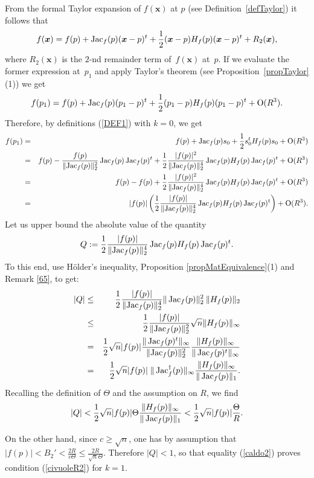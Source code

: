 \documentclass[10pt]{article}
\newcommand{\x}{{\bm x}}
\def\Jac{\mathop{\rm Jac}\nolimits}
\begin{document}
{From the formal Taylor expansion of $f(\x)$ at $p$ (see 
Definition~\ref{defTaylor}) it follows that
$$
f(\x) = f(p) + \Jac_f(p) (\x-p)^t + \frac{1}{2}(\x-p)H_f(p) (\x-p)^t + R_2(\x),
$$
where $R_2(\bm x)$ is the $2$-nd remainder term of~$f(\x)$ at~$p$.
If we evaluate the former expression at~$p_1$ and apply 
Taylor's theorem (see Proposition~\ref{propTaylor}(1)) we get
\begin{eqnarray*}
f(p_1) = f(p) + \Jac_f(p) (p_1-p)^t + 
\frac{1}{2}(p_1-p)H_f(p) (p_1-p)^t + {\rm O}(R^3).
\end{eqnarray*}
Therefore, by  definitions (\ref{DEF1}) with $k=0$,
we get
\begin{eqnarray}\label{caldo2} \nonumber
f(p_1)  &=&  f(p) + \Jac_f(p) s_0 +  \frac{1}{2} s_0^t H_f(p) s_0 + {\rm O}(R^3)\\ \nonumber
&=&  f(p) - \frac{f(p)}{\|{\rm Jac}_f(p)\|_2^2} \Jac_f(p)  \Jac_f(p)^t +  
\frac{1}{2} \frac{|f(p)|^2}{\|{\rm Jac}_f(p)\|_2^4} \Jac_f(p) H_f(p) \Jac_f(p)^t + {\rm O}(R^3)\\ \nonumber
&=& f(p) - f(p) +  
\frac{1}{2} \frac{|f(p)|^2}{\|{\rm Jac}_f(p)\|_2^4} \Jac_f(p) H_f(p) \Jac_f(p)^t + {\rm O}(R^3)\\ 
&=&  |f(p)| \left ( 
\frac{1}{2} \frac{|f(p)|}{\|{\rm Jac}_f(p)\|_2^4} \Jac_f(p) H_f(p) \Jac_f(p)^t \right ) + {\rm O}(R^3). 
\end{eqnarray}
Let us upper bound the absolute value of the quantity
$$
Q:= \frac{1}{2} \frac{|f(p)|}{\|{\rm Jac}_f(p)\|_2^4} \Jac_f(p) H_f(p) \Jac_f(p)^t.
$$
To this end, use  H\"older's inequality, 
 Proposition  \ref{propMatEquivalence}(1) and Remark \ref{65}, to get:
\begin{eqnarray*}
|Q| &\le & \frac{1}{2} \frac{|f(p)|}{\|{\rm Jac}_f(p)\|_2^4}  \| \Jac_f(p)\|_2^2 \: \|H_f(p)\|_2\\
&\le & \frac{1}{2} \frac{|f(p)|}{\|{\rm Jac}_f(p)\|_2^2}  \sqrt{n} \|H_f(p)\|_\infty \\
&=&  \frac{1}{2} \sqrt{n} |f(p)| \frac{\|\Jac_f(p)^t\|_\infty}{\|{\rm Jac}_f(p)\|_2^2}  
\frac{\|H_f(p)\|_\infty}{\|\Jac_f(p)^t\|_\infty}\\
&=& \frac{1}{2} \sqrt{n} |f(p)| \; \|\Jac_f^\dagger(p)\|_\infty  \frac{\| H_f(p)\|_\infty}{\|\Jac_f(p)\|_1}.   
\end{eqnarray*}
Recalling the definition of $\Theta$ and the assumption on $R$, we find
$$
|Q|< \frac{1}{2} \sqrt{n} |f(p)| \Theta  \frac{ \| H_f(p)\|_\infty}{\|\Jac_f(p)\|_1} < \frac{1}{2} \sqrt{n} |f(p)| \frac{\Theta}{R}. 
$$

On the other hand, since $c\geq \sqrt{n}$,  one has by assumption  that 
$|f(p)| < B_2' < \frac{2R}{c \Theta} \le \frac{2R}{ \sqrt{n} \Theta}$.
Therefore  $|Q|<1$,  so that equality (\ref{caldo2})  proves condition (\ref{civuoleR2}) for $k=1$.
\smallskip

}
\end{document}
